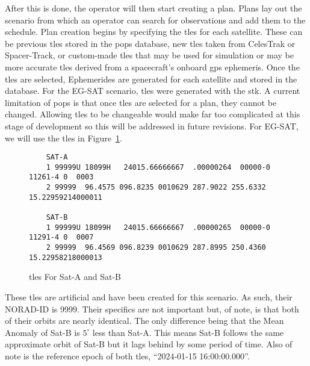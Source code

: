After this is done, the operator will then start creating a plan. Plans lay out
the scenario from which an operator can search for observations and add
them to the schedule. Plan creation begins by specifying the
\glspl{tle} for each satellite.  These can be previous \glspl{tle} stored in
the \gls{pops} database, new \glspl{tle} taken from CelesTrak or Spacer-Track,
or custom-made \glspl{tle} that may be used for simulation or may be more
accurate \glspl{tle} derived from a spacecraft’s onboard \gls{gps} ephemeris.
Once the \glspl{tle} are selected, Ephemerides are generated for each satellite and
stored in the database. For the EG-SAT scenario, \glspl{tle} were generated
with the \gls{stk}. A current limitation of \gls{pops} is that once \glspl{tle}
are selected for a plan, they cannot be changed. Allowing \glspl{tle} to be
changeable would make far too complicated at this stage of development so this
will be addressed in future revisions. For EG-SAT, we will use the \glspl{tle}
in Figure~\ref{fig:tles}.

\begin{figure}[h]
    \begin{verbatim}
    SAT-A
    1 99999U 18099H   24015.66666667  .00000264  00000-0  11261-4 0  0003
    2 99999  96.4575 096.8235 0010629 287.9022 255.6332 15.22959214000011

    SAT-B
    1 99999U 18099H   24015.66666667  .00000265  00000-0  11291-4 0  0007
    2 99999  96.4569 096.8239 0010629 287.8995 250.4360 15.22958218000013
    \end{verbatim}
    \caption{\glspl{tle} For Sat-A and Sat-B}
    \label{fig:tles}
\end{figure}

These \glspl{tle} are artificial and have been created for this scenario. As
such, their NORAD-ID is 9999. Their specifics are not important but, of note,
is that both of their orbits are nearly identical. The only difference being
that the Mean Anomaly of Sat-B is $5^\circ$ less than Sat-A. This means Sat-B
follows the same approximate orbit of Sat-B but it lags behind by some period
of time. Also of note is the reference epoch of both \glspl{tle}, ``2024-01-15
16:00:00.000''.


